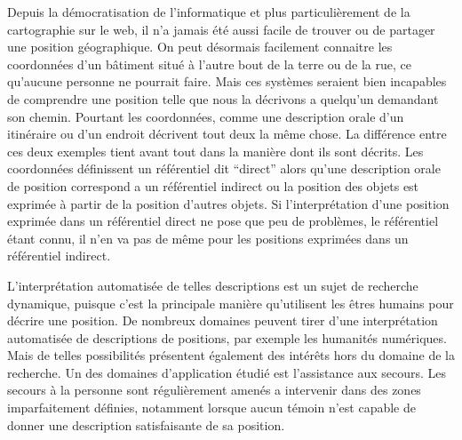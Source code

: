 
Depuis la démocratisation de l'informatique et plus particulièrement
de la cartographie sur le web, il n'a jamais été aussi facile de
trouver ou de partager une position géographique. On peut désormais
facilement connaitre les coordonnées d'un bâtiment situé à l'autre
bout de la terre ou de la rue, ce qu'aucune personne ne pourrait
faire. Mais ces systèmes seraient bien incapables de comprendre une
position telle que nous la décrivons a quelqu’un demandant son
chemin. Pourtant les coordonnées, comme une description orale d'un
itinéraire ou d'un endroit décrivent tout deux la même chose. La
différence entre ces deux exemples tient avant tout dans la manière
dont ils sont décrits. Les coordonnées définissent un référentiel dit
\enquote{direct} alors qu'une description orale de position correspond
a un référentiel indirect ou la position des objets est exprimée à
partir de la position d'autres objets. Si l’interprétation d'une
position exprimée dans un référentiel direct ne pose que peu de
problèmes, le référentiel étant connu, il n'en va pas de même pour les
positions exprimées dans un référentiel indirect.

L'interprétation automatisée de telles descriptions est un sujet de
recherche dynamique, puisque c'est la principale manière qu'utilisent
les êtres humains pour décrire une position. De nombreux domaines
peuvent tirer d'une interprétation automatisée de descriptions de
positions, par exemple les humanités numériques. Mais de telles
possibilités présentent également des intérêts hors du domaine de la
recherche. Un des domaines d’application étudié est l'assistance aux
secours. Les secours à la personne sont régulièrement amenés a
intervenir dans des zones imparfaitement définies, notamment lorsque
aucun témoin  n'est capable de donner une description satisfaisante de
sa position.









